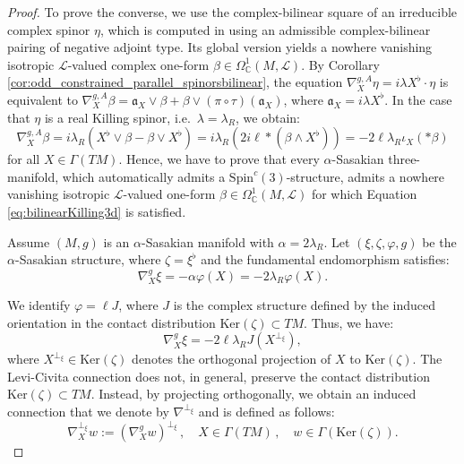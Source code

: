 \documentclass[10pt,a4paper,twoside,reqno]{amsart}
\theoremstyle{plain}
\theoremstyle{definition}
\theoremstyle{remark}
\def\C{\mathbb{C}}
\def\fra{\mathfrak{a}}
\def\Spin{\mathrm{Spin}}
\def\Spin{\mathrm{Spin}}
\def\cL{\mathcal{L}}
\renewcommand{\ker}{\mathrm{Ker}}
\begin{document}
\begin{proof}
To prove the converse, we use the complex-bilinear square of an irreducible complex spinor $\eta$, which is computed in \cite[Cor.\ 5.5]{Algebraic_Complex_Square_2025} using an admissible complex-bilinear pairing of negative adjoint type. Its global version yields a nowhere vanishing isotropic $\cL$-valued complex one-form $\beta\in\Omega^1_\C(M,\cL)$. By Corollary \ref{cor:odd_constrained_parallel_spinorsbilinear}, the equation $\nabla^{g,A}_X\eta=i\lambda X^\flat\cdot\eta$ is equivalent to $\nabla^{g,A}_X\beta=\fra_X\vee\beta+\beta\vee(\pi\circ\tau)(\fra_X)$, where $\fra_X=i\lambda X^\flat$. In the case that $\eta$ is a real Killing spinor, i.e.\ $\lambda=\lambda_R$, we obtain: 
\begin{equation}
\label{eq:bilinearKilling3d}
\nabla^{g,A}_X\beta=i\lambda_R(X^\flat\vee\beta-\beta\vee X^\flat)=i\lambda_R(2i\ell*(\beta\wedge X^\flat))= -2\ell\lambda_R\iota_X(*\beta)
\end{equation}
for all $X\in\Gamma(TM)$. Hence, we have to prove that every $\alpha$-Sasakian three-manifold, which automatically admits a $\Spin^c(3)$-structure, admits a nowhere vanishing isotropic $\cL$-valued one-form $\beta\in\Omega^1_\C(M,\cL)$ for which Equation \eqref{eq:bilinearKilling3d} is satisfied.\medskip

Assume $(M,g)$ is an $\alpha$-Sasakian manifold with $\alpha = 2\lambda_R$. Let $(\xi, \zeta, \varphi, g)$ be the $\alpha$-Sasakian structure, where $\zeta = \xi^\flat$ and the fundamental endomorphism satisfies:
\begin{equation*}
\nabla^g_X \xi = - \alpha \varphi(X) = -2\lambda_R \varphi(X).
\end{equation*}

\noindent
We identify $\varphi = \ell J$, where $J$ is the complex structure defined by the induced orientation in the contact distribution $\ker (\zeta)\subset TM$. Thus, we have:
\begin{equation*}
\nabla^g_X \xi = - 2\ell \lambda_R J(X^{\perp_{\xi}}),
\end{equation*}
where $X^{\perp_{\xi}} \in \ker(\zeta)$ denotes the orthogonal projection  of $X$ to $\ker(\zeta)$. The Levi-Civita connection does not, in general, preserve the contact distribution $\ker(\zeta)\subset TM$. Instead, by projecting orthogonally, we obtain an induced connection that we denote by $\nabla^{\perp_{\xi}}$ and is defined as follows:
\begin{equation*}
\nabla^{\perp_{\xi}}_X w := (\nabla_X^g w)^{\perp_{\xi}}\, , \quad X\in\Gamma(TM)\, , \quad w \in \Gamma(\ker(\zeta)).
\end{equation*}


\end{proof}
\end{document}
